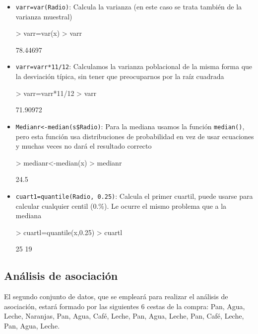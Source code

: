 \documentclass[a4paper, 12pt]{article}
\begin{document}
\begin{itemize}
		\item \texttt{varr=var(Radio)}: Calcula la varianza (en este caso se trata también de la varianza muestral)
\begin{Schunk}
\begin{Sinput}
> varr=var(x)
> varr
\end{Sinput}
\begin{Soutput}
[1] 78.44697
\end{Soutput}
\end{Schunk}
		\item \texttt{varr=varr*11/12}: Calculamos la varianza poblacional de la misma forma que la desviación típica, sin tener que preocuparnos por la raíz cuadrada
\begin{Schunk}
\begin{Sinput}
> varr=varr*11/12
> varr
\end{Sinput}
\begin{Soutput}
[1] 71.90972
\end{Soutput}
\end{Schunk}
		\item \texttt{Medianr<-median(s\$Radio)}: Para la mediana usamos la función \texttt{median()}, pero esta función usa distribuciones de probabilidad en vez de usar ecuaciones y muchas veces no dará el resultado correcto
\begin{Schunk}
\begin{Sinput}
> medianr<-median(x)
> medianr
\end{Sinput}
\begin{Soutput}
[1] 24.5
\end{Soutput}
\end{Schunk}
		\item \texttt{cuart1=quantile(Radio, 0.25)}: Calcula el primer cuartil, puede usarse para calcular cualquier centil (0.\%). Le ocurre el mismo problema que a la mediana
\begin{Schunk}
\begin{Sinput}
> cuartl=quantile(x,0.25)
> cuartl
\end{Sinput}
\begin{Soutput}
25%
 19 
\end{Soutput}
\end{Schunk}
	\end{itemize}
	
	
	\subsection{Análisis de asociación}
	El segundo conjunto de datos, que se empleará para realizar el análisis de asociación, estará formado por las siguientes 6 cestas de la compra: {Pan, Agua, Leche, Naranjas}, {Pan, Agua, Café, Leche}, {Pan, Agua, Leche}, {Pan, Café, Leche}, {Pan, Agua}, {Leche}.
	
\end{document}
